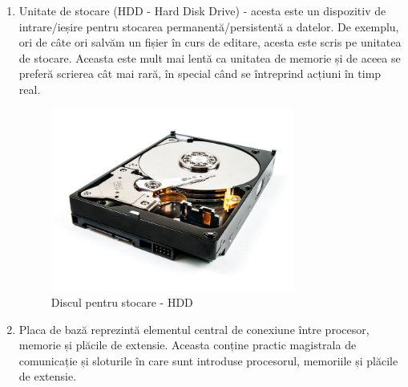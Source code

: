 \begin{enumerate}

	\item Unitate de stocare (HDD  - Hard Disk
		Drive) - acesta este un dispozitiv de intrare/ieșire pentru
		stocarea permanentă/persistentă a datelor. De exemplu, ori de
		câte ori salvăm un fișier în curs de editare, acesta este scris
		pe unitatea de stocare. Aceasta este mult mai lentă ca unitatea
		de memorie și de aceea se preferă scrierea cât mai rară, în
		special când se întreprind acțiuni în timp real.

\begin{figure}[!htbp]
	\centering
	\includegraphics[width=8cm]{chapters/08-hw/img/hdd-img.png}
	\caption{Discul pentru stocare - HDD\protect\footnotemark}
	\label{fig:hw-hdd}
\end{figure}


	\item Placa de bază reprezintă elementul central de conexiune între
		procesor, memorie și plăcile de extensie. Aceasta conține
		practic magistrala de comunicație și sloturile în care sunt
		introduse procesorul, memoriile și plăcile de extensie.




\end{enumerate}
